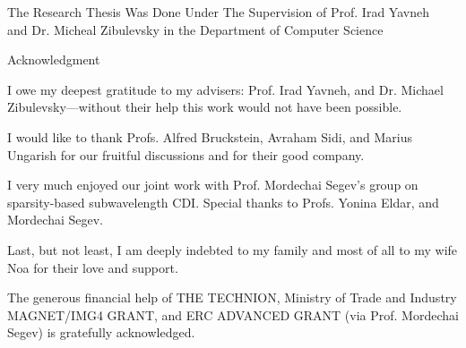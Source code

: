 \thispagestyle{empty}
\begin{doublespace}
  \begin{center}
    The Research Thesis Was Done Under The Supervision of
    Prof. Irad Yavneh \\
    and Dr. Micheal Zibulevsky in the Department of Computer Science
  \end{center}
  \vspace{3cm}
  \begin{center}
    {\LARGE Acknowledgment}
  \end{center} 
  \vspace{2\baselineskip} I owe my deepest gratitude to my advisers:
  Prof. Irad Yavneh, and Dr. Michael Zibulevsky---without their help
  this work would not have been possible.

  I would like to thank Profs. Alfred Bruckstein, Avraham
  Sidi, and Marius Ungarish for our
  fruitful discussions and for their good company.

  I very much enjoyed our joint work with Prof. Mordechai Segev's
  group on sparsity-based subwavelength CDI. Special thanks to
  Profs. Yonina Eldar, and Mordechai Segev.

  Last, but not least, I am deeply indebted to my family and
  most of all to my wife Noa for their love and support.
\end{doublespace}
\vfill{}
The generous financial help of THE TECHNION, Ministry of Trade and
Industry MAGNET/IMG4 GRANT, and
ERC ADVANCED GRANT (via Prof. Mordechai Segev) is gratefully acknowledged.
\newpage\normalsize\thispagestyle{empty}

